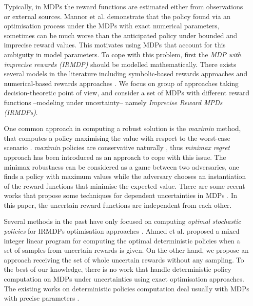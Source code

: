 
Typically, in MDPs the reward functions are estimated either from observations or external sources. Mannor et al.  demonstrate that the policy found via an optimisation process under the MDPs with exact numerical parameters, sometimes can be much worse than the anticipated policy under bounded and imprecise reward values. This motivates using MDPs that account for this ambiguity in model parameters. To cope with this problem, first the \textit{MDP with imprecise rewards (IRMDP)} should be modelled mathematically. There exists several models in the literature including symbolic-based rewards approaches \cite{Furnkranz2012,Weng2012} and numerical-based rewards approaches \cite{bell1982,Regan2009,Xu2009}. We focus on group of approaches taking decision-theoretic point of view, and consider a set of MDPs with different reward functions --modeling under uncertainty-- namely \textit{Imprecise Reward MPDs (IRMDPs)}. 

One common approach in computing a robust solution is the \textit{maximin} method, that computes a policy maximising the value with respect to the worst-case scenario \cite{GIVAN2000,Iyengar2005,mastin2012,Nilim2005}. \textit{maximin} policies are conservative naturally \cite{Delage2007}, thus \textit{minimax regret} approach \cite{Regan2009,Xu2009} has been introduced as an approach to cope with this issue. The minimax robustness can be considered as a game between two adversaries, one finds a policy with maximum values while the adversary chooses an instantiation of the reward functions that minimise the expected value. There are some recent works that propose some techniques for dependent uncertainties in MDPs \cite{Mannor2012,Wiesemann2013}. In this paper, the uncertain reward functions are independent from each other. 

Several methods in the past have only focused on computing  \textit{optimal stochastic policies} for IRMDPs optimisation approaches \cite{Regan2009,Regan2010,Xu2009}. %
Ahmed et al. \citep{Ahmed2017} proposed a mixed integer linear program for computing the optimal deterministic policies when a set of samples from uncertain rewards is given.  On the other hand, we propose an approach receiving the set of whole uncertain rewards without any sampling. To the best of our knowledge, there is no work that handle deterministic policy computation on MDPs under uncertainties using exact optimisation approaches. The existing works on deterministic policies computation deal usually with MDPs with precise parameters \cite{Dolgov2005,Montufar2015}. %